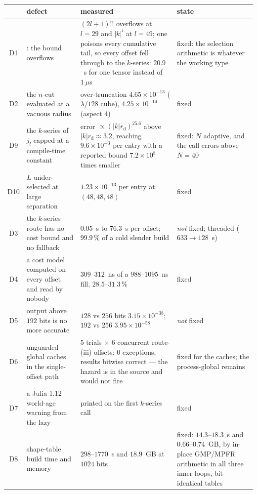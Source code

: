 \begin{center}\footnotesize
\begin{tabular}{@{}cL{0.24\textwidth}L{0.36\textwidth}L{0.24\textwidth}@{}}
\toprule
& defect & measured & state\\
\midrule
D1 & : the bound overflows &
$(2l+1)!!$ overflows at $l = 29$ and $|k|^l$ at $l = 49$; one  poisons every
cumulative tail, so every offset fell through to the $k$-series: $20.9$~s for one tensor
instead of $1~\mu$s & fixed: the selection arithmetic is  whatever the
working type\\
D2 & the $n$-cut evaluated at a vacuous radius &
over-truncation $4.65\times10^{-13}$ ($\lambda/128$ cube), $4.25\times10^{-14}$ (aspect 4)
& fixed\\
D9 & the $k$-series of $j_l$ capped at a compile-time constant &
error $\propto (|k|r_{\mathrm{d}})^{25.6}$ above $|k|r_{\mathrm{d}} \approx 3.2$, reaching
$9.6\times10^{-3}$ per entry with a reported bound $7.2\times10^{8}$ times smaller &
fixed: $N$ adaptive, and the call errors above $N = 40$\\
D10 & $L$ under-selected at large separation &
$1.23\times10^{-13}$ per entry at $(48,48,48)$ & fixed\\
D3 & the $k$-series route has no cost bound and no fallback &
$0.05$~s to $76.3$~s per offset; $99.9\,\%$ of a cold slender build &
\emph{not} fixed; threaded ($633 \to 128$~s)\\
D4 & a cost model computed on every offset and read by nobody &
$309$--$312$~ns of a $988$--$1095$~ns fill, $28.5$--$31.3\,\%$ & fixed\\
D5 &  output above $192$ bits is no more accurate &
$128$ vs $256$ bits $3.15\times10^{-38}$; $192$ vs $256$ $3.95\times10^{-58}$ &
\emph{not} fixed\\
D6 & unguarded global caches in the single-offset path &
$5$ trials $\times$ $6$ concurrent route-(iii) offsets: $0$ exceptions, results bitwise
correct --- the hazard is in the source and would not fire & fixed for the caches; the
process-global  remains\\
D7 & a Julia 1.12 world-age warning from the lazy  & printed on the first
$k$-series call & fixed\\
D8 & shape-table build time and memory &
$298$--$1770$~s and $18.9$~GB at $1024$ bits & fixed: $14.3$--$18.3$~s and $0.66$--$0.74$~GB, by
in-place GMP/MPFR arithmetic in all three inner loops, bit-identical tables\\
\bottomrule
\end{tabular}
\end{center}

